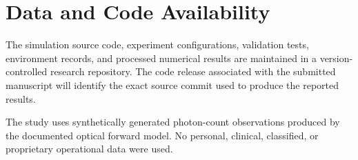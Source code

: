 \section*{Data and Code Availability}

The simulation source code, experiment configurations, validation tests,
environment records, and processed numerical results are maintained in a
version-controlled research repository. The code release associated with
the submitted manuscript will identify the exact source commit used to
produce the reported results.

The study uses synthetically generated photon-count observations produced
by the documented optical forward model. No personal, clinical, classified,
or proprietary operational data were used.
